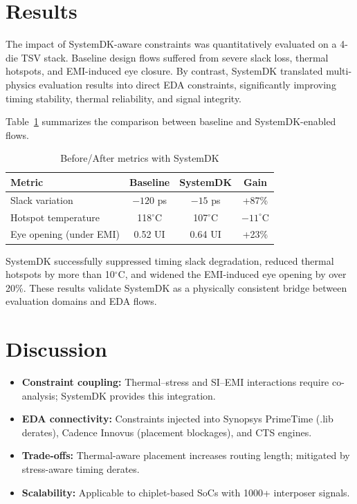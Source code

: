 \documentclass[conference]{IEEEtran}
\begin{document}
\section{Results}
The impact of SystemDK-aware constraints was quantitatively evaluated on a 4-die TSV stack.
Baseline design flows suffered from severe slack loss, thermal hotspots, and EMI-induced eye closure.
By contrast, SystemDK translated multi-physics evaluation results into direct EDA constraints, significantly improving timing stability, thermal reliability, and signal integrity.

Table~\ref{tab:results} summarizes the comparison between baseline and SystemDK-enabled flows.

\begin{table}[htbp]
\centering
\caption{Before/After metrics with SystemDK}
\label{tab:results}
\setlength{\tabcolsep}{6pt}
\renewcommand{\arraystretch}{1.25}
\footnotesize
\begin{tabular}{|l|c|c|c|}
\hline
\textbf{Metric} & \textbf{Baseline} & \textbf{SystemDK} & \textbf{Gain} \\
\hline
Slack variation & $-120$ ps & $-15$ ps & +87\% \\
Hotspot temperature & 118$^\circ$C & 107$^\circ$C & $-11^\circ$C \\
Eye opening (under EMI) & 0.52 UI & 0.64 UI & +23\% \\
\hline
\end{tabular}
\end{table}

SystemDK successfully suppressed timing slack degradation,
reduced thermal hotspots by more than 10$^\circ$C,
and widened the EMI-induced eye opening by over 20\%.
These results validate SystemDK as a physically consistent bridge between evaluation domains and EDA flows.

\section{Discussion}
\begin{itemize}
  \item \textbf{Constraint coupling:} Thermal–stress and SI–EMI interactions require co-analysis; SystemDK provides this integration.
  \item \textbf{EDA connectivity:} Constraints injected into Synopsys PrimeTime (.lib derates), Cadence Innovus (placement blockages), and CTS engines.
  \item \textbf{Trade-offs:} Thermal-aware placement increases routing length; mitigated by stress-aware timing derates.
  \item \textbf{Scalability:} Applicable to chiplet-based SoCs with 1000+ interposer signals.
\end{itemize}
\end{document}
